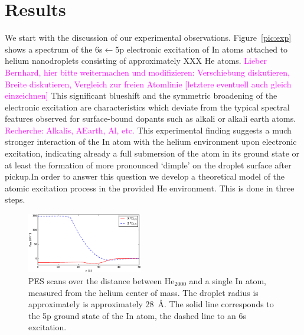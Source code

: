 \documentclass[twoside,twocolumn,9pt]{article}
\def\hl#1{\textcolor{magenta}{#1}}  %
\begin{document}
\section{Results}
We start with the discussion of our experimental observations. Figure~\ref{pic:exp} shows a spectrum of the 6s$\leftarrow{}$5p electronic excitation of In atoms attached to helium nanodroplets consisting of approximately XXX He atoms. \hl{Lieber Bernhard, hier bitte weitermachen und modifizieren: Verschiebung diskutieren, Breite diskutieren, Vergleich zur freien Atomlinie [letztere eventuell auch gleich einzeichnen]} This significant blueshift and the symmetric broadening of the electronic excitation are characteristics which deviate from the typical spectral features observed for surface-bound dopants such as alkali or alkali earth atoms. \hl{Recherche: Alkalis, AEarth, Al, etc.} This experimental finding suggests a much stronger interaction of the In atom with the helium environment upon electronic excitation, indicating already a full submersion of the atom in its ground state or at least the formation of  more pronounced `dimple' on the droplet surface after pickup.In order to answer this question we develop a theoretical model of the atomic excitation process in the provided He environment. This is done in three steps.

\begin{figure}[htbp!]
  	\begin{center}
 		\includegraphics[width=0.45\textwidth]{3.eps}
                \caption{PES scans over the distance between He$_{2000}$ and a single In atom, measured from the helium center of mass. The droplet radius is approximately is approximately 28~\AA. The solid line corresponds to the 5p ground state of the In atom, the dashed line to an 6s excitation.\label{pic:scan}}
  	\end{center}
\end{figure}
\end{document}
